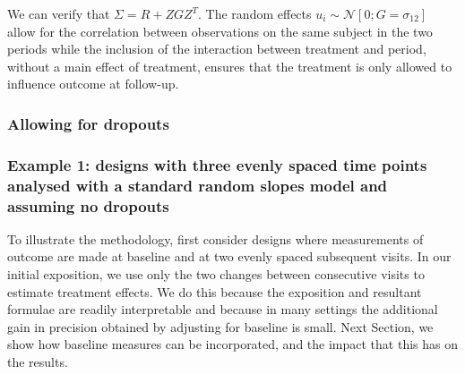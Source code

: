 \documentclass[final, paper=letter,5p,times,twocolumn]{elsarticle}
\theoremstyle{definition}
\begin{document}
We can verify that $\Sigma = R + ZGZ^{T}$. The random effects $u_{i} \sim \mathcal{N}[0; G = \sigma_{12}]$ allow for the correlation between observations on the same subject in the two periods while the inclusion of the interaction between treatment and period, without a main effect of treatment, ensures that the treatment is only allowed to influence outcome at follow-up.

\subsubsection{Allowing for dropouts}

\subsubsection{Example 1: designs with three evenly spaced time points analysed with a standard random slopes model and assuming no dropouts}

To illustrate the methodology, first consider designs where measurements of outcome are made at baseline and at two evenly spaced subsequent visits. In our initial exposition, we use only the two changes between consecutive visits to estimate treatment effects. We do this because the exposition and resultant formulae are readily interpretable and because in many settings the additional gain in precision obtained by adjusting for baseline is small. Next Section, we show how baseline measures can be incorporated, and the impact that this has on the results.
\end{document}
